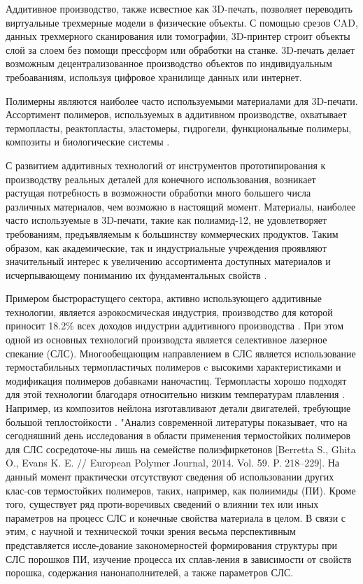 

Аддитивное производство, также исвестное как 3D-печать, позволяет переводить виртуальные трехмерные модели в физические объекты. С помощью срезов CAD, данных трехмерного сканирования или томографии, 3D-принтер строит объекты слой за слоем без помощи прессформ или обработки на станке. 3D-печать делает возможным децентрализованное производство объектов по индивидуальным требоаваниям, используя цифровое хранилище данных или интернет. 

Полимерны являются наиболее часто используемыми материалами для 3D-печати. Ассортимент полимеров, используемых в аддитивном производстве, охватывает термопласты, реактопласты, эластомеры, гидрогели, функциональные полимеры, композиты и биологические системы \cite{3d-review}. 

С развитием аддитивных технологий от инструментов прототипирования к производству реальных деталей для конечного использования, возникает растущая потребность в возможности  обработки много большего числа различных материалов, чем возможно в настоящий момент. Материалы, наиболее часто используемые в 3D-печати, такие как полиамид-12, не удовлетворяет требованиям, предъявляемым к большинству коммерческих продуктов. Таким образом, как академические, так и индустриальные учреждения проявляют значительный интерес к увеличению ассортимента доступных материалов и исчерпывающему пониманию их фундаментальных свойств \cite{sls-material}.

Примером быстрорастущего сектора, активно использующего аддитивные технологии, является аэрокосмическая индустрия, производство для которой приносит 18.2\% всех доходов индустрии аддитивного производства \cite{avia}. При этом одной из основных технологий производста является селективное лазерное спекание (СЛС). Многообещающим направлением в СЛС является использование  термостабильных термопластичых полимеров c высокими характеристиками и модификация полимеров добавками наночастиц. Термопласты хорошо подходят для этой технологии благодаря относительно низким температурам плавления \cite{conditions}. Например, из композитов нейлона изготавливают детали двигателей, требующие большой теплостойкости \cite{avia}.
  	"Анализ современной литературы показывает, что на сегодняшний день исследования в области применения термостойких полимеров для СЛС сосредоточе-ны лишь на семействе полиэфиркетонов [Berretta S., Ghita O., Evans K. E. // European Polymer Journal, 2014. Vol. 59. P. 218–229]. На данный момент практически отсутствуют сведения об использовании других клас-сов термостойких полимеров, таких, например, как полиимиды (ПИ). 
  Кроме того, существует ряд проти-воречивых сведений о влиянии тех или иных параметров на процесс СЛС и конечные свойства материала в целом. В связи с этим, с научной и технической точки зрения весьма перспективным представляется иссле-дование закономерностей формирования структуры при СЛС порошков ПИ, изучение процесса их сплав-ления в зависимости от свойств порошка, содержания нанонаполнителей, а также параметров СЛС.
\cite{yudin-red}
  
